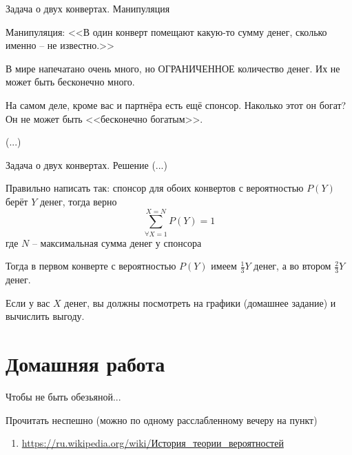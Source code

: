 \begin{frame}{Задача о двух конвертах. Манипуляция}

Манипуляция: 
<<В один конверт помещают какую-то сумму денег,
сколько именно -- не известно.>>

В мире напечатано очень много, но ОГРАНИЧЕННОЕ 
количество денег.
Их не может быть бесконечно много.

На самом деле, кроме вас и партнёра есть ещё спонсор.
Наколько этот он богат?
Он не может быть <<бесконечно богатым>>.

(...)
\end{frame}

\begin{frame}{Задача о двух конвертах. Решение}
\small
(...)

Правильно написать так:
спонсор для обоих конвертов с вероятностью $P(Y)$ берёт $Y$ денег,
тогда верно
\begin{equation}
\sum_{\forall X=1}^{X=N} P(Y) = 1
\end{equation}
где $N$ -- максимальная сумма денег у спонсора	

Тогда в первом конверте с вероятностью $P(Y)$ имеем $\frac{1}{3}Y$ денег,
а во втором $\frac{2}{3}Y$ денег.


Если у вас $X$ денег,
вы должны посмотреть на графики (домашнее задание)
и вычислить выгоду.

	



\end{frame}


\section{Домашняя работа}

\begin{frame}{Чтобы не быть обезьяной...}
	
Прочитать неспешно
(можно по одному расслабленному вечеру на пункт)
\begin{enumerate}
	\item \url{https://ru.wikipedia.org/wiki/История_теории_вероятностей}
\end{enumerate}

\end{frame}


